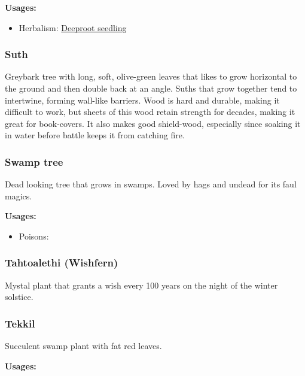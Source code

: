 \textbf{Usages:}

\begin{itemize}[noitemsep]
\item[] Herbalism: \hyperref[Deeproot seedling]{Deeproot seedling}
\end{itemize}

\subsubsection{Suth}

Greybark tree with long, soft, olive-green leaves that likes to grow horizontal to the ground and then double back at an angle. Suths that grow together tend to intertwine, forming wall-like barriers. Wood is hard and durable, making it difficult to work, but sheets of this wood retain strength for decades, making it great for book-covers. It also makes good shield-wood, especially since soaking it in water before battle keeps it from catching fire.

\subsubsection{Swamp tree}
\label{Swamp tree}

Dead looking tree that grows in swamps. Loved by hags and undead for its faul magics.

\vspace{5mm}

\textbf{Usages:}

\begin{itemize}[noitemsep]
\item[] Poisons: \poison
\end{itemize}

\subsubsection{Tahtoalethi (Wishfern)}

Mystal plant that grants a wish every 100 years on the night of the winter solstice.

\subsubsection{Tekkil}
\label{Tekkil}

Succulent swamp plant with fat red leaves.

\vspace{5mm}

\textbf{Usages:}

